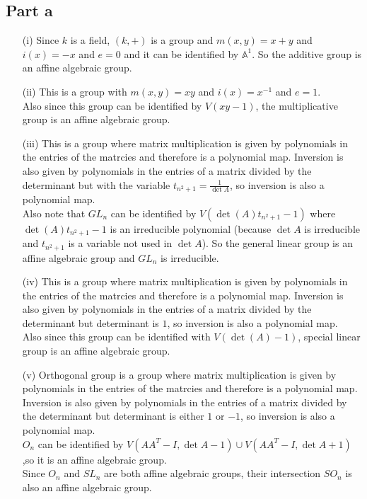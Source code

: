 \documentclass[12pt]{article}
\begin{document}
\subsection*{Part a}
\begin{enumerate}
\item[(i)] Since $k$ is a field, $(k,+)$ is a group and $m(x,y)=x+y$ and $i(x)=-x$ and $e=0$ and it can be identified by $\mathbb{A}^1$. So the additive group is an affine algebraic group.
\item[(ii)] This is a group with $m(x,y)=xy$ and $i(x)=x^{-1}$ and $e=1$. \\
Also since this group can be identified by $V(xy-1)$, the multiplicative group is an affine algebraic group.
\item[(iii)] This is a group where matrix multiplication is given by polynomials in the entries of the matrcies and therefore is a polynomial map. Inversion is also given by polynomials in the entries of a matrix divided by the determinant but with the variable $t_{n^2+1}=\frac{1}{\det A}$, so inversion is also a polynomial map. \\
Also note that $GL_n$ can be identified by $V(\det(A)t_{n^2+1}-1)$ where
$\det(A)t_{n^2+1}-1$ is an irreducible polynomial (because $\det A$ is irreducible and $t_{n^2+1}$ is a variable not used in $\det A$). So the general linear group is an affine algebraic group and $GL_n$ is irreducible.
\item[(iv)] This is a group where matrix multiplication is given by polynomials in the entries of the matrcies and therefore is a polynomial map. Inversion is also given by polynomials in the entries of a matrix divided by the determinant but determinant is $1$, so inversion is also a polynomial map. \\
Also since this group can be identified with $V(\det (A)-1)$, special linear group is an affine algebraic group.
\item[(v)] Orthogonal group is a group where matrix multiplication is given by polynomials in the entries of the matrcies and therefore is a polynomial map. Inversion is also given by polynomials in the entries of a matrix divided by the determinant but determinant is either $1$ or $-1$, so inversion is also a polynomial map. \\
$O_n$ can be identified by $V(AA^T-I,\det A -1) \cup  V(AA^T-I,\det A +1)$,so it is an affine algebraic group. \\
Since $O_n$ and $SL_n$ are both affine algebraic groups, their intersection $SO_n$ is also an affine algebraic group.
\end{enumerate}
\end{document}
